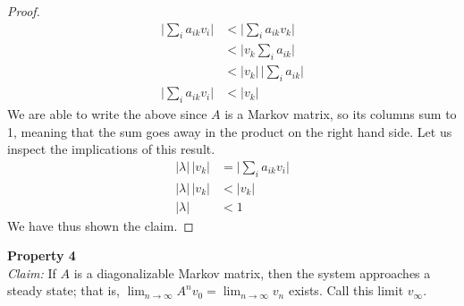 \documentclass[10pt]{article}
\begin{document}
\begin{proof}
\begin{align*}
    \Big|\sum_{i} a_{ik} v_i\Big| &< \Big|\sum_{i} a_{ik} v_k\Big|\\
    &< \Big|v_k \sum_{i} a_{ik}\Big|\\
    &< |v_k| \,\Big|\sum_{i} a_{ik}\Big|\\
    \Big|\sum_{i} a_{ik} v_i\Big| &< |v_k|
\end{align*}
We are able to write the above since $A$ is a Markov matrix, so its columns sum to 1, meaning that the sum goes away in the product on the right hand side. Let us inspect the implications of this result.
\begin{align*}
    |\lambda|\,|v_k| &= \Big|\sum_{i} a_{ik} v_i\Big|\\
    |\lambda|\,|v_k| &< |v_k|\\
    |\lambda| &< 1
\end{align*}
We have thus shown the claim.
\end{proof}\vspace{0.5cm}
\textbf{Property 4}\\
\textit{Claim:} If $A$ is a diagonalizable Markov matrix, then the system approaches a steady state; that is, $\lim_{n\rightarrow\infty} A^nv_0 = \lim_{n\rightarrow\infty} v_n$ exists. Call this limit $v_\infty$.
\end{document}
